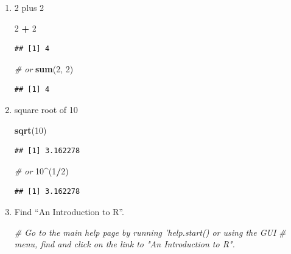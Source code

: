 \documentclass[]{book}
\newenvironment{Shaded}{\begin{snugshade}}{\end{snugshade}}
\newcommand{\CommentTok}[1]{\textcolor[rgb]{0.56,0.35,0.01}{\textit{#1}}}
\newcommand{\DecValTok}[1]{\textcolor[rgb]{0.00,0.00,0.81}{#1}}
\newcommand{\KeywordTok}[1]{\textcolor[rgb]{0.13,0.29,0.53}{\textbf{#1}}}
\newcommand{\NormalTok}[1]{#1}
\newcommand{\OperatorTok}[1]{\textcolor[rgb]{0.81,0.36,0.00}{\textbf{#1}}}
\newcommand{\StringTok}[1]{\textcolor[rgb]{0.31,0.60,0.02}{#1}}
\begin{document}
\begin{enumerate}
\def\labelenumi{\arabic{enumi}.}
\item
  2 plus 2

\begin{Shaded}
\begin{Highlighting}[]
\DecValTok{2} \OperatorTok{+}\StringTok{ }\DecValTok{2}
\end{Highlighting}
\end{Shaded}

\begin{verbatim}
## [1] 4
\end{verbatim}

\begin{Shaded}
\begin{Highlighting}[]
\CommentTok{# or}
\KeywordTok{sum}\NormalTok{(}\DecValTok{2}\NormalTok{, }\DecValTok{2}\NormalTok{)}
\end{Highlighting}
\end{Shaded}

\begin{verbatim}
## [1] 4
\end{verbatim}
\item
  square root of 10

\begin{Shaded}
\begin{Highlighting}[]
\KeywordTok{sqrt}\NormalTok{(}\DecValTok{10}\NormalTok{)}
\end{Highlighting}
\end{Shaded}

\begin{verbatim}
## [1] 3.162278
\end{verbatim}

\begin{Shaded}
\begin{Highlighting}[]
\CommentTok{# or}
\DecValTok{10}\OperatorTok{^}\NormalTok{(}\DecValTok{1}\OperatorTok{/}\DecValTok{2}\NormalTok{)}
\end{Highlighting}
\end{Shaded}

\begin{verbatim}
## [1] 3.162278
\end{verbatim}
\item
  Find ``An Introduction to R''.

\begin{Shaded}
\begin{Highlighting}[]
\CommentTok{# Go to the main help page by running 'help.start() or using the GUI}
\CommentTok{# menu, find and click on the link to "An Introduction to R".}
\end{Highlighting}
\end{Shaded}
\end{enumerate}
\end{document}
